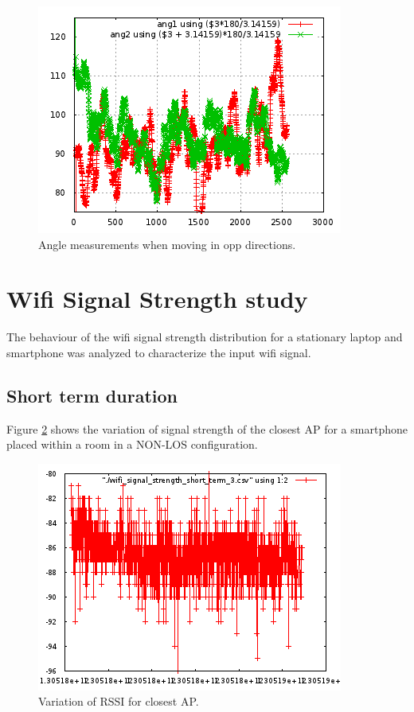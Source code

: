 \begin{figure}\centering
    \includegraphics{figures/angle_180_corridoor.png}
    \caption{Angle measurements when moving in opp directions.\label{fig:angle_180_corridoor}}
\end{figure}



\section{Wifi Signal Strength study}

The behaviour of the wifi signal strength distribution for a stationary laptop 
and smartphone was analyzed to characterize the input wifi signal.

\subsection{Short term duration}

Figure \ref{fig:closestAPshortterm} shows the variation of signal strength of 
the closest AP for a smartphone placed within a room in a NON-LOS configuration.

\begin{figure}\centering
    \includegraphics{figures/short_term_wifi.png}
    \caption{Variation of RSSI for closest AP. \label{fig:closestAPshortterm}}
\end{figure}


